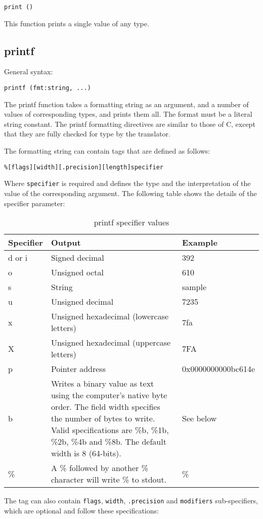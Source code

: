 \documentclass[twoside,english]{article}
\providecommand{\tabularnewline}{\\}
\newenvironment{vindent}
{\begin{list}{}{\setlength{\listparindent}{6pt}}
\item[]}
{\end{list}}
\begin{document}
\begin{vindent}
\begin{verbatim}
print ()
\end{verbatim}
\end{vindent}
This function prints a single value of any type.


\subsection{printf}
General syntax:

\begin{vindent}
\begin{verbatim}
printf (fmt:string, ...)
\end{verbatim}
\end{vindent}
The printf function takes a formatting string as an argument, and a number
of values of corresponding types, and prints them all. The format must be a
literal string constant. The printf formatting directives are similar to those
of C, except that they are fully checked for type by the translator.

The formatting string can contain tags that are defined as follows:

\begin{vindent}
\begin{verbatim}
%[flags][width][.precision][length]specifier
\end{verbatim}
\end{vindent}
Where \texttt{specifier} is required and defines the type and the interpretation
of the value of the corresponding argument. The following table shows the
details of the specifier parameter:

\begin{table}[H]
\caption{printf specifier values}
\begin{tabular}{|>{\raggedright}p{1in}|>{\raggedright}p{3.5in}|>{\raggedright}p{1.25in}|}
\hline
\textbf{Specifier}&
\textbf{Output}&
\textbf{Example}\tabularnewline
\hline
\hline
d or i&
Signed decimal&
392\tabularnewline
\hline
o&
Unsigned octal&
610\tabularnewline
\hline
s&
String&
sample\tabularnewline
\hline
u&
Unsigned decimal&
7235\tabularnewline
\hline
x&
Unsigned hexadecimal (lowercase letters)&
7fa\tabularnewline
\hline
X&
Unsigned hexadecimal (uppercase letters)&
7FA\tabularnewline
\hline
p&
Pointer address&
0x0000000000bc614e\tabularnewline
\hline
b&
Writes a binary value as text using the computer's native byte order.
The field width specifies the number of bytes
to write. Valid specifications are \%b, \%1b, \%2b, \%4b and \%8b. The default
width is 8 (64-bits).&
See below\tabularnewline
\hline
\%&
A \% followed by another \% character will write \% to stdout.&
\%\tabularnewline
\hline
\end{tabular}
\end{table}
The tag can also contain \texttt{flags}, \texttt{width}, \texttt{.precision}
and \texttt{modifiers} sub-specifiers, which are optional and follow these
specifications:
\end{document}
